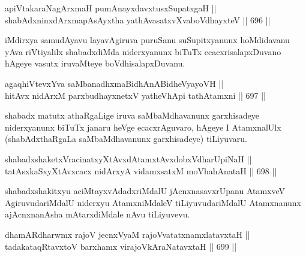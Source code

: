 
\begin{shl}
apiVtakaraNagArxmaH pumAnayxdavxtusxSupatxgaH || \\
shabAdxninxdArxmapAsAyxtha yathAvasatxvXvaboVdhayxteV \hfill || 696 ||  
\end{shl}

\begin{artha} 
iMdirxya samudAyavu layavAgiruva puruSanu suSupitxyanunx hoMdidavanu
yAva riVtiyalilx shabadxdiMda niderxyanunx biTuTx ecacxrisalapxDuvano 
hAgeye vasutx iruvaMteye boVdhisalapxDuvanu.
\end{artha}


\begin{shl}
agaqhiVtevxYva saMbanadhxmaBidhAnABidheVyayoVH || \\
hitAvx nidArxM parxbudhayxnetxV yatheVhApi tathA\s \s tamxni \hfill || 697 || 
\end{shl}

\begin{artha} 
shabadx matutx athaRgaLige iruva saMbaMdhavanunx garxhisadeye 
niderxyanunx biTuTx janaru heVge ecacxrAguvaro, hAgeye I AtamxnalUlx 
(shabAdxthaRgaLa saMbaMdhavanunx garxhisadeye) tiLiyuvaru.
\end{artha}

\begin{shl}
shabadxshaketxVracinatxyXtAvxdAtamxtAvxdobxVdharUpiNaH || \\
tatAsxkaSxyXtAvxcacx nidArxyA vidamxsatxM moVhahAnataH \hfill || 698 ||  
\end{shl}

\begin{artha} 
shabadxshakitxyu aciMtayxvAdadxriMdalU jAcnxnasavxrUpanu AtamxveV\break
AgiruvudariMdalU niderxyu AtamxniMdaleV tiLiyuvudariMdalU 
Atamxnanunx ajAcnxnanAsha mAtarxdiMdale nAvu tiLiyuvevu.
\end{artha}


\begin{shl}
dhamARdharwmx rajoV jecnxVyaM rajoVvatatxnamxlatavxtaH || \\
tadakataqRtavxtoV barxhamx virajoV\s kAraNatavxtaH \hfill || 699 ||  
\end{shl}


